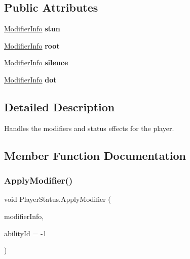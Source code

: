 \subsection*{Public Attributes}
\begin{DoxyCompactItemize}
\item 
\hypertarget{class_player_status_a7b5dc81e094339f19683136ff2e2e13d}{}\label{class_player_status_a7b5dc81e094339f19683136ff2e2e13d} 
\hyperlink{struct_modifier_info}{Modifier\+Info} {\bfseries stun}
\item 
\hypertarget{class_player_status_af22a19b3d69ef7d6419a4174950431a0}{}\label{class_player_status_af22a19b3d69ef7d6419a4174950431a0} 
\hyperlink{struct_modifier_info}{Modifier\+Info} {\bfseries root}
\item 
\hypertarget{class_player_status_aac3ecdaa7339383b206afc0b18e3969a}{}\label{class_player_status_aac3ecdaa7339383b206afc0b18e3969a} 
\hyperlink{struct_modifier_info}{Modifier\+Info} {\bfseries silence}
\item 
\hypertarget{class_player_status_af9f83ad817a9ff167fff3ff9f1869b74}{}\label{class_player_status_af9f83ad817a9ff167fff3ff9f1869b74} 
\hyperlink{struct_modifier_info}{Modifier\+Info} {\bfseries dot}
\end{DoxyCompactItemize}


\subsection{Detailed Description}
Handles the modifiers and status effects for the player. 



\subsection{Member Function Documentation}
\hypertarget{class_player_status_ab8756b7695fdb92d6e1bfb41136e9e64}{}\label{class_player_status_ab8756b7695fdb92d6e1bfb41136e9e64} 
\subsubsection{\texorpdfstring{Apply\+Modifier()}{ApplyModifier()}}
{\footnotesize\ttfamily void Player\+Status.\+Apply\+Modifier (\begin{DoxyParamCaption}\item[{\hyperlink{struct_modifier_info}{Modifier\+Info}}]{modifier\+Info,  }\item[{int}]{ability\+Id = {\ttfamily -\/1} }\end{DoxyParamCaption})}



